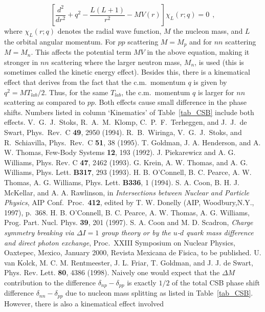 \begin{references}
\begin{displaymath}
   \left[\frac{d^2}{dr^2}+q^2-\frac{L(L+1)}{r^2}-MV(r)\right]
        \chi_L(r;q) = 0 \>\>, 
\end{displaymath}
where $\chi_L(r;q)$ denotes the radial wave function, $M$ the nucleon mass,
and $L$ the orbital angular momentum. 
For $pp$ scattering $M=M_p$ and for $nn$ scattering $M=M_n$.
This affects the potential term $MV$ in the above equation, making
it stronger in $nn$ scattering where the larger neutron mass, $M_n$,
is used (this is sometimes called the kinetic energy effect). 
Besides this, there is a kinematical effect that derives from the fact that
the c.m.\ momentum $q$ is given by $q^2=MT_{lab}/2$.
Thus, for the same $T_{lab}$, the c.m.\ momentum $q$
is larger for $nn$ scattering as compared to $pp$.
Both effects cause small difference in the phase shifts.
Numbers listed in column `Kinematics' of Table~\ref{tab_CSB}
include both effects.
 V.\ G.\ J.\ Stoks, R.\ A.\ M.\ Klomp, C.\ P.\ F.\ Terheggen, 
and J.\ J.\ de Swart, Phys.\ Rev.\ C {\bf 49}, 2950 (1994).
 R.\ B.\ Wiringa, V.\ G.\ J.\ Stoks, and R.\ Schiavilla, 
Phys.\ Rev.\ C {\bf 51}, 38 (1995).
 T. Goldman, J. A. Henderson, and A. W. Thomas, Few-Body
Systems {\bf 12}, 193 (1992).
 J. Piekarewicz and A. G. Williams, Phys. Rev. C {\bf 47},
2462 (1993).
 G. Krein, A. W. Thomas, and A. G. Williams,
Phys. Lett. {\bf B317}, 293 (1993).
 H. B. O'Connell, B. C. Pearce, A. W. Thomas, 
A. G. Williams, 
Phys. Lett. {\bf B336}, 1 (1994).
 S. A. Coon, B. H. J. McKellar, and A. A. Rawlinson, in
{\it Intersections between Nuclear and Particle Physics},
AIP Conf.\ Proc.\ {\bf 412}, edited by T. W. Donelly (AIP, Woodbury,N.Y., 1997),
p.~368.
 H. B. O'Connell, B. C. Pearce, A. W. Thomas, 
A. G. Williams, 
Prog. Part. Nucl. Phys. {\bf 39}, 201 (1997). 
 S. A. Coon and M. D. Scadron, 
{\it Charge symmetry breaking via $\Delta I = 1$ group theory or by the
$u$-$d$ quark mass difference and direct photon exchange},
Proc.\ XXIII Symposium on Nuclear
Physics, Oaxtepec, Mexico, January 2000,
Revista Mexicana de Fisica, to be published.
 U. van Kolck, M. C. M. Rentmeester, J. L. Friar, T. Goldman,
and J. J. de Swart, Phys. Rev. Lett. {\bf 80}, 4386 (1998).
Naively one would expect that the $\Delta M$ contribution to the 
difference $\delta_{np} - \delta_{pp}$ 
is exactly $1/2$ of the total CSB phase
shift difference $\delta_{nn} - \delta_{pp}$ 
due to 
nucleon mass splitting as listed in Table~\ref{tab_CSB}.
However, there is also a kinematical effect involved

\end{references}
